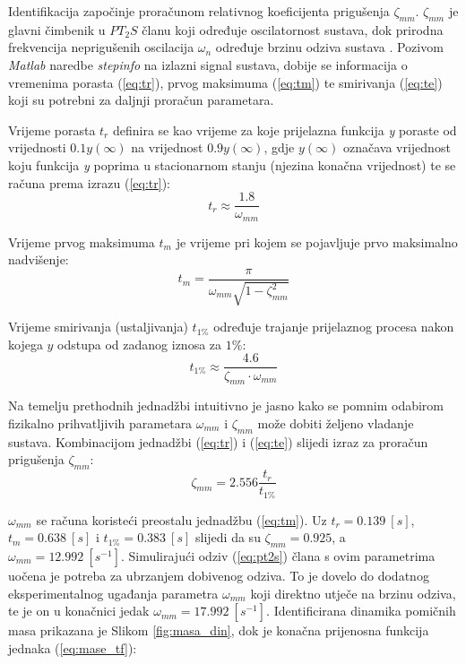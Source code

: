 \documentclass[11pt,a4paper]{article}
\begin{document}
Identifikacija započinje proračunom relativnog koeficijenta prigušenja $\zeta_{mm}$. $\zeta_{mm}$ je glavni čimbenik u $PT_{2}S$ članu koji određuje oscilatornost sustava, dok prirodna frekvencija neprigušenih oscilacija $\omega_{n}$ određuje brzinu odziva sustava \cite{aupr}. Pozivom \textit{Matlab} naredbe \textit{stepinfo} na izlazni signal sustava, dobije se informacija o vremenima porasta (\ref{eq:tr}), prvog maksimuma (\ref{eq:tm}) te smirivanja (\ref{eq:te}) koji su potrebni za daljnji proračun parametara. 

\medskip

Vrijeme porasta $t_{r}$ definira se kao vrijeme za koje prijelazna funkcija \textit{y} poraste od vrijednosti $0.1y(\infty)$ na vrijednost $0.9y(\infty)$, gdje $y(\infty)$ označava vrijednost koju funkcija \textit{y} poprima u stacionarnom stanju (njezina konačna vrijednost) te se računa prema izrazu (\ref{eq:tr}):
\begin{equation}
t_{r} \approx \frac{1.8}{\omega_{mm}}
\label{eq:tr}
\end{equation}


Vrijeme prvog maksimuma $t_{m}$ je vrijeme pri kojem se pojavljuje prvo maksimalno nadvišenje:
\begin{equation}
t_{m} = \frac{\pi}{\omega_{mm}\sqrt{1 - \zeta_{mm}^{2}}}
\label{eq:tm}
\end{equation}

Vrijeme smirivanja (ustaljivanja) $t_{1\%}$ određuje trajanje prijelaznog procesa nakon kojega $y$ odstupa od zadanog iznosa za $1\%$:
\begin{equation}
t_{1\%} \approx \frac{4.6}{\zeta_{mm} \cdot \omega_{mm}}
\label{eq:te}
\end{equation}

Na temelju prethodnih jednadžbi intuitivno je jasno kako se pomnim odabirom fizikalno prihvatljivih parametara $\omega_{mm}$ i $\zeta_{mm}$ može dobiti željeno vladanje sustava. Kombinacijom jednadžbi (\ref{eq:tr}) i (\ref{eq:te}) slijedi izraz za proračun prigušenja $\zeta_{mm}$:
\begin{equation}
\zeta_{mm} = 2.556 \frac{t_{r}}{t_{1\%}}
\label{eq:zeta}
\end{equation}

$\omega_{mm}$ se računa koristeći preostalu jednadžbu (\ref{eq:tm}). Uz $t_{r} = 0.139 \ [s]$, $t_{m} = 0.638 \ [s]$ i $t_{1\%} = 0.383 \ [s]$ slijedi da su $\zeta_{mm} = 0.925$, a $\omega_{mm} = 12.992 \ [s^{-1}]$. Simulirajući odziv (\ref{eq:pt2s}) člana s ovim parametrima uočena je potreba za ubrzanjem dobivenog odziva. To je dovelo do dodatnog eksperimentalnog ugađanja parametra $\omega_{mm}$ koji direktno utječe na brzinu odziva, te je on u konačnici jedak $\omega_{mm} = 17.992 \ [s^{-1}]$. Identificirana dinamika pomičnih masa prikazana je Slikom \ref{fig:masa_din}, dok je konačna prijenosna funkcija jednaka (\ref{eq:mase_tf}):
\end{document}
